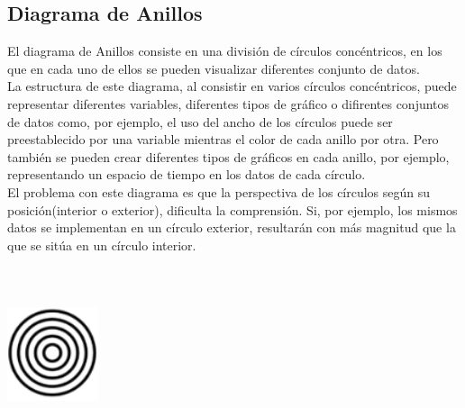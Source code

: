 \documentclass{article}\usepackage[]{graphicx}\usepackage[]{color}
\begin{document}
\subsection{Diagrama de Anillos}
El diagrama de Anillos consiste en una divisi\'on de c\'irculos conc\'entricos, en los que en cada uno de ellos se pueden visualizar diferentes conjunto de datos.~\\
La estructura de este diagrama, al consistir en varios c\'irculos conc\'entricos, puede representar diferentes variables, diferentes tipos de gr\'afico o difirentes conjuntos de datos como, por ejemplo, el uso del ancho de los c\'irculos puede ser preestablecido por una variable mientras el color de cada anillo por otra. Pero tambi\'en se pueden crear diferentes tipos de gr\'aficos en cada anillo, por ejemplo, representando un espacio de tiempo en los datos de cada c\'irculo.~\\
El problema con este diagrama es que la perspectiva de los c\'irculos seg\'un su posici\'on(interior o exterior), dificulta la comprensi\'on. Si, por ejemplo, los mismos datos se implementan en un c\'irculo exterior, resultar\'an con m\'as magnitud que la que se sit\'ua en un c\'irculo interior.~\\
~\\~\\~\\
\vbox{
    \centering
    \includegraphics[width=0.2\textwidth]{imag/anillos}
}
\clearpage
\end{document}

